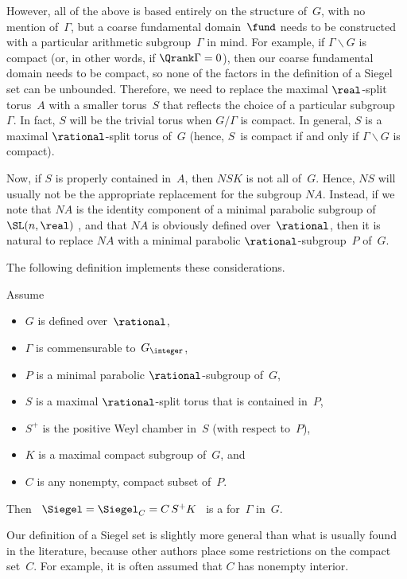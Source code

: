 However, all of the above is based entirely on the structure of~$G$, with no mention of~$\Gamma$, but a coarse fundamental domain~$\fund$ needs to be constructed with a particular arithmetic subgroup~$\Gamma$ in mind.
For example, if $\Gamma \backslash G$ is compact (or, in other words, if $\Qrank \Gamma = 0$), then our coarse fundamental domain needs to be compact, so none of the factors in the definition of a Siegel set can be unbounded. 
Therefore, we need to replace the maximal $\real$-split torus~$A$ with a smaller torus~$S$ that reflects the choice of a particular subgroup~$\Gamma$. In fact, $S$ will be the trivial torus when $G/\Gamma$ is compact. In general, $S$ is a maximal $\rational$-split torus of~$G$ (hence, $S$~is compact if and only if $\Gamma \backslash G$ is compact).

Now, if $S$ is properly contained in~$A$, then $NSK$ is not all of~$G$. Hence, $NS$ will usually not be the appropriate replacement for the subgroup $NA$. Instead, if we note that $NA$ is the identity component of a minimal parabolic subgroup of $\SL(n,\real)$ , and that $NA$ is obviously defined over~$\rational$, then it is natural to replace $NA$ with a minimal parabolic $\rational$-subgroup~$P$ of~$G$.

The following definition implements these considerations. 

\begin{defn} \label{ArithSiegelDefn} 
Assume
\noprelistbreak
	\begin{itemize}
	\item $G$ is defined over~$\rational$,
	\item $\Gamma$ is commensurable to~$G_{\integer}$,
	\item $P$ is a minimal parabolic $\rational$-subgroup of~$G$,
	\item $S$ is a maximal $\rational$-split torus that is contained in~$P$,
	\item $S^+$ is the positive Weyl chamber in~$S$ (with respect to~$P$), 
	\item $K$ is a maximal compact subgroup of~$G$,
	and 
	\item $C$ is any nonempty, compact subset of~$P$.
	\end{itemize}
Then 
	\ $\Siegel = \Siegel_C = C \, S^+ K $ \ 
is a  for~$\Gamma$ in~$G$.
\end{defn}

\begin{warn}
Our definition of a Siegel set is slightly more general than what is usually found in the literature, because other authors place some restrictions on the compact set~$C$.
For example, it is often assumed that $C$ has nonempty interior.
\end{warn}



